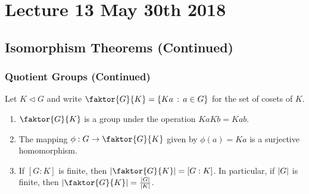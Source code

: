 \chapter{Lecture 13 May 30th 2018}%
\label{chp:lecture_13_may_30th_2018}

\section{Isomorphism Theorems (Continued)}%
\label{sec:isomorphism_theorems_continued}

\subsection{Quotient Groups (Continued)}%
\label{sub:quotient_groups_continued}

\begin{propo}
\label{propo:propo_related_to_quotient_groups}
  Let $K \triangleleft G$ and write $\faktor{G}{K} = \{Ka \, : \, a \in G\}$ for the set of cosets of $K$.
  \begin{enumerate}
    \item $\faktor{G}{K}$ is a group under the operation $Ka Kb = Kab$.
    \item The mapping $\phi : G \to \faktor{G}{K}$ given by $\phi(a) = Ka$ is a surjective homomorphism.
    \item If $[G : K]$ is finite, then $\abs{\faktor{G}{K}} = [G : K]$. In particular, if $\left|G\right|$ is finite, then $\abs{\faktor{G}{K}} = \frac{\abs{G}}{\abs{K}}$.
  \end{enumerate}
\end{propo}

